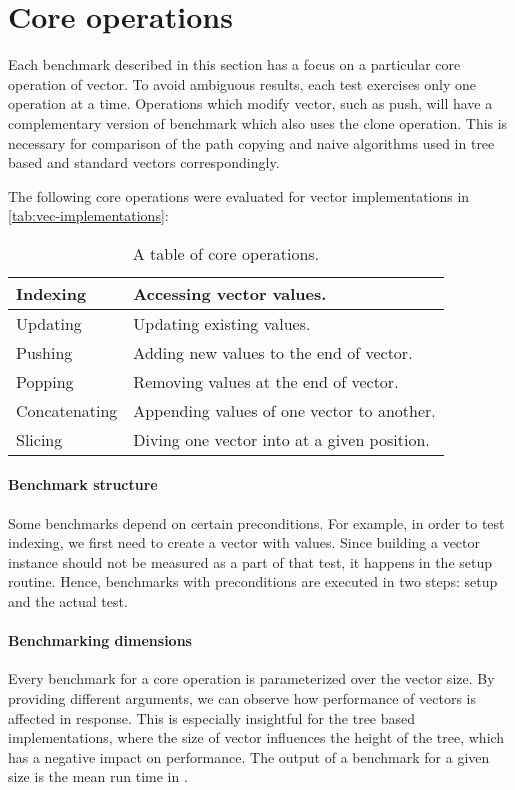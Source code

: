 \section{Core operations}
Each benchmark described in this section has a focus on a particular core operation of vector. To avoid ambiguous results, each test exercises only one operation at a time. Operations which modify vector, such as push, will have a complementary version of benchmark which also uses the clone operation. This is necessary for comparison of the path copying and naive algorithms used in tree based and standard vectors correspondingly. 

The following core operations were evaluated for vector implementations in \ref{tab:vec-implementations}:

\begin{table}[!htbp]
    \centering

    \begin{tabular} { |l| p{10cm} | }
        \hline 
        Indexing & Accessing vector values. \\ \hline
        Updating & Updating existing values. \\ \hline
        Pushing & Adding new values to the end of vector. \\ \hline
        Popping & Removing values at the end of vector. \\ \hline
        Concatenating & Appending values of one vector to another. \\ \hline
        Slicing & Diving one vector into at a given position. \\ \hline        
    \end{tabular}
    
    \label{tab:vec-core-operations}
    \caption{A table of core operations.}
\end{table}

\paragraph*{Benchmark structure}
Some benchmarks depend on certain preconditions. For example, in order to test indexing, we first need to create a vector with values. Since building a vector instance should not be measured as a part of that test, it happens in the setup routine. Hence, benchmarks with preconditions are executed in two steps: setup and the actual test. 

\paragraph*{Benchmarking dimensions}
Every benchmark for a core operation is parameterized over the vector size. By providing different arguments, we can observe how performance of vectors is affected in response. This is especially insightful for the tree based implementations, where the size of vector influences the height of the tree, which has a negative impact on performance. The output of a benchmark for a given size is the mean run time in . 

